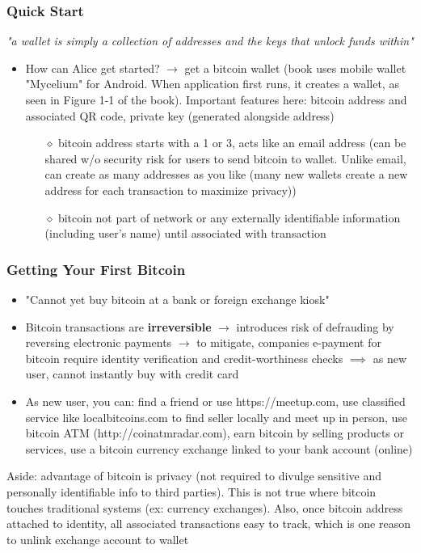 \documentclass[english, 11pt]{article}
\begin{document}
\subsubsection{Quick Start}
\textit{"a wallet is simply a collection of addresses and the keys that unlock funds within"}
\begin{itemize}
    \item How can Alice get started? $\rightarrow$ get a bitcoin wallet (book uses mobile wallet "Mycelium" for Android. When application first runs, it creates a wallet, as seen in Figure 1-1 of the book). Important features here: bitcoin address and associated QR code, private key (generated alongside address)
    \begin{itemize}
        \item [$\diamond$] bitcoin address starts with a 1 or 3, acts like an email address (can be shared w/o security risk for users to send bitcoin to wallet. Unlike email, can create as many addresses as you like (many new wallets create a new address for each transaction to maximize privacy))
        \item [$\diamond$] bitcoin not part of network or any externally identifiable information (including user's name) until associated with transaction
    \end{itemize}
\end{itemize}

\subsubsection{Getting Your First Bitcoin}
\begin{itemize}
    \item "Cannot yet buy bitcoin at a bank or foreign exchange kiosk"
    \item Bitcoin transactions are \textbf{irreversible} $\rightarrow$ introduces risk of defrauding by reversing electronic payments $\rightarrow$ to mitigate, companies e-payment for bitcoin require identity verification and credit-worthiness checks $\implies$ as new user, cannot instantly buy with credit card
    \item As new user, you can: find a friend or use https://meetup.com, use classified service like localbitcoins.com to find seller locally and meet up in person, use bitcoin ATM (http://coinatmradar.com), earn bitcoin by selling products or services, use a bitcoin currency exchange linked to your bank account (online)
\end{itemize}
\begin{flushleft}
    \text Aside: advantage of bitcoin is privacy (not required to divulge sensitive and personally identifiable info to third parties). This is not true where bitcoin touches traditional systems (ex: currency exchanges). Also, once bitcoin address attached to identity, all associated transactions easy to track, which is one reason to unlink exchange account to wallet
\end{flushleft}
\end{document}
